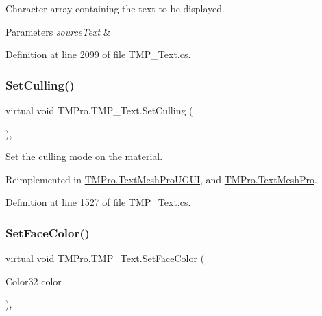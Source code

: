 Character array containing the text to be displayed. 


\begin{DoxyParams}{Parameters}
{\em source\+Text} & \\
\hline
\end{DoxyParams}


Definition at line 2099 of file T\+M\+P\+\_\+\+Text.\+cs.

\mbox{\label{class_t_m_pro_1_1_t_m_p___text_afd461774563d324758a3d21f5085edf1}} 
\subsubsection{\texorpdfstring{SetCulling()}{SetCulling()}}
{\footnotesize\ttfamily virtual void T\+M\+Pro.\+T\+M\+P\+\_\+\+Text.\+Set\+Culling (\begin{DoxyParamCaption}{ }\end{DoxyParamCaption})\hspace{0.3cm}{\ttfamily [protected]}, {\ttfamily [virtual]}}



Set the culling mode on the material. 



Reimplemented in \mbox{\hyperlink{class_t_m_pro_1_1_text_mesh_pro_u_g_u_i_a1042bb0fdc0289c8d159570b9ee3bb5e}{T\+M\+Pro.\+Text\+Mesh\+Pro\+U\+G\+UI}}, and \mbox{\hyperlink{class_t_m_pro_1_1_text_mesh_pro_a0754ccdc79d70ff05ffaf120bf766c4b}{T\+M\+Pro.\+Text\+Mesh\+Pro}}.



Definition at line 1527 of file T\+M\+P\+\_\+\+Text.\+cs.

\mbox{\label{class_t_m_pro_1_1_t_m_p___text_a7737931333692ee9f01dd1e94cf68a45}} 
\subsubsection{\texorpdfstring{SetFaceColor()}{SetFaceColor()}}
{\footnotesize\ttfamily virtual void T\+M\+Pro.\+T\+M\+P\+\_\+\+Text.\+Set\+Face\+Color (\begin{DoxyParamCaption}\item[{Color32}]{color }\end{DoxyParamCaption})\hspace{0.3cm}{\ttfamily [protected]}, {\ttfamily [virtual]}}



